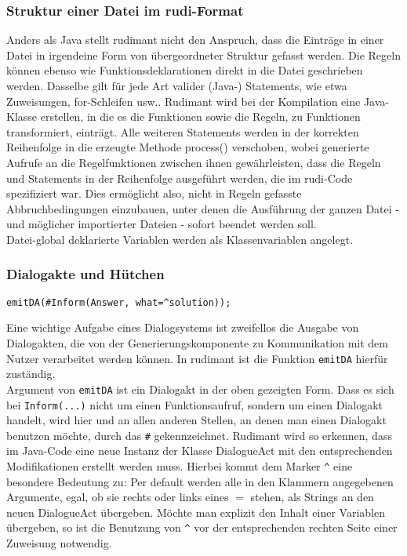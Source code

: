 
\subsubsection{Struktur einer Datei im rudi-Format}

Anders als Java stellt rudimant nicht den Anspruch, dass die Einträge in einer Datei in irgendeine Form von übergeordneter Struktur gefasst werden. Die Regeln können ebenso wie Funktionsdeklarationen direkt in die Datei geschrieben werden. Dasselbe gilt für jede Art valider (Java-) Statements, wie etwa Zuweisungen, for-Schleifen usw.. Rudimant wird bei der Kompilation eine Java-Klasse erstellen, in die es die Funktionen sowie die Regeln, zu Funktionen transformiert, einträgt. Alle weiteren Statements werden in der korrekten Reihenfolge in die erzeugte Methode process() verschoben, wobei generierte Aufrufe an die Regelfunktionen zwischen ihnen gewährleisten, dass die Regeln und Statements in der Reihenfolge ausgeführt werden, die im rudi-Code spezifiziert war. Dies ermöglicht also, nicht in Regeln gefasste Abbruchbedingungen einzubauen, unter denen die Ausführung der ganzen Datei - und möglicher importierter Dateien - sofort beendet werden soll.\\
Datei-global deklarierte Variablen werden als Klassenvariablen angelegt.

\subsubsection{Dialogakte und Hütchen} %

\begin{small}
\begin{verbatim}
emitDA(#Inform(Answer, what=^solution));
\end{verbatim}
\end{small}
Eine wichtige Aufgabe eines Dialogsystems ist zweifellos die Ausgabe von Dialogakten, die von der Generierungskomponente zu Kommunikation mit dem Nutzer verarbeitet werden können. In rudimant ist die Funktion \texttt{emitDA} hierfür zuständig.\\
Argument von \texttt{emitDA} ist ein Dialogakt in der oben gezeigten Form. Dass es sich bei \texttt{Inform}\verb|(...)| nicht um einen Funktionsaufruf, sondern um einen Dialogakt handelt, wird  hier und an allen anderen Stellen, an denen man einen Dialogakt benutzen möchte, durch das \verb|#| gekennzeichnet. Rudimant wird so erkennen, dass im Java-Code eine neue Instanz der Klasse DialogueAct mit den entsprechenden Modifikationen erstellt werden muss. Hierbei kommt dem Marker {\Large\verb|^|} eine besondere Bedeutung zu: Per default werden alle in den Klammern angegebenen Argumente, egal, ob sie rechts oder links eines $=$ stehen, als Strings an den neuen DialogueAct übergeben. Möchte man explizit den Inhalt einer Variablen übergeben, so ist die Benutzung von {\Large\verb|^|} vor der entsprechenden rechten Seite einer Zuweisung notwendig.

